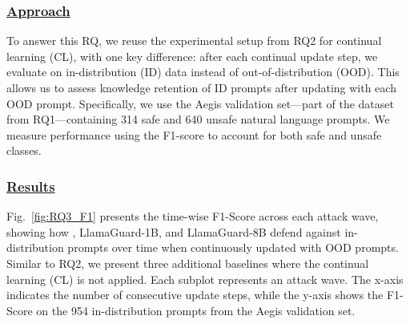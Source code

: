 \subsubsection*{\underline{\textbf{Approach}}}
To answer this RQ, we reuse the experimental setup from RQ2 for continual learning (CL), with one key difference: after each continual update step, we evaluate on in-distribution (ID) data instead of out-of-distribution (OOD). This allows us to assess knowledge retention of ID prompts after updating with each OOD prompt. Specifically, we use the Aegis validation set—part of the dataset from RQ1—containing 314 safe and 640 unsafe natural language prompts. We measure performance using the F1-score to account for both safe and unsafe classes.




\subsubsection*{\underline{\textbf{Results}}}
Fig.~\ref{fig:RQ3_F1} presents the time-wise F1-Score across each attack wave, showing how \ourapp, LlamaGuard-1B, and LlamaGuard-8B defend against in-distribution prompts over time when continuously updated with OOD prompts.
Similar to RQ2, we present three additional baselines where the continual learning (CL) is not applied.
Each subplot represents an attack wave. The x-axis indicates the number of consecutive update steps, while the y-axis shows the F1-Score on the 954 in-distribution prompts from the Aegis validation set.

